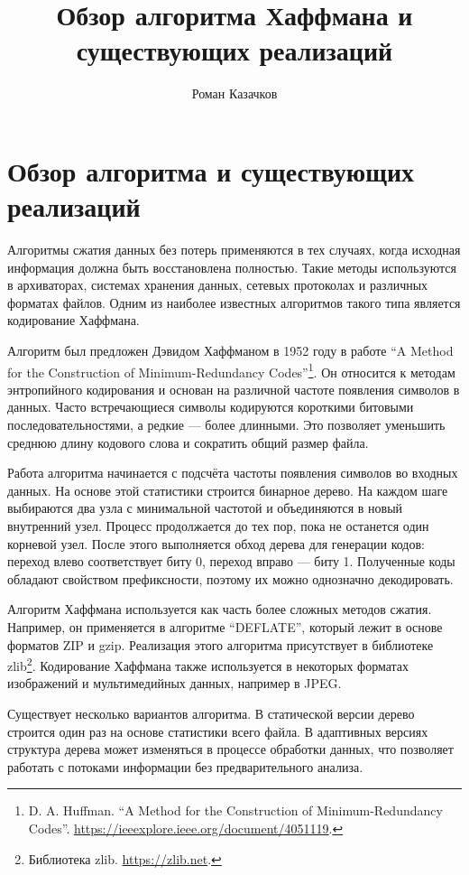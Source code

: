 \documentclass[a4paper]{article}
\title{Обзор алгоритма Хаффмана и существующих реализаций}
\author{Роман Казачков}
\date{}
\begin{document}
\maketitle

\section{Обзор алгоритма и существующих реализаций}

Алгоритмы сжатия данных без потерь применяются в тех случаях, когда исходная
информация должна быть восстановлена полностью. Такие методы используются в
архиваторах, системах хранения данных, сетевых протоколах и различных форматах
файлов. Одним из наиболее известных алгоритмов такого типа является кодирование
Хаффмана.

Алгоритм был предложен Дэвидом Хаффманом в 1952 году в работе \enquote{A Method
for the Construction of Minimum-Redundancy Codes}\footnote{D. A. Huffman.
\enquote{A Method for the Construction of Minimum-Redundancy Codes}.
\url{https://ieeexplore.ieee.org/document/4051119}.}. Он относится к методам энтропийного кодирования
и основан на различной частоте появления символов в данных. Часто встречающиеся
символы кодируются короткими битовыми последовательностями, а редкие --- более
длинными. Это позволяет уменьшить среднюю длину кодового слова и сократить
общий размер файла.

Работа алгоритма начинается с подсчёта частоты появления символов во входных
данных. На основе этой статистики строится бинарное дерево. На каждом шаге
выбираются два узла с минимальной частотой и объединяются в новый внутренний
узел. Процесс продолжается до тех пор, пока не останется один корневой узел.
После этого выполняется обход дерева для генерации кодов: переход влево
соответствует биту 0, переход вправо --- биту 1. Полученные коды обладают
свойством префиксности, поэтому их можно однозначно декодировать.

Алгоритм Хаффмана используется как часть более сложных методов сжатия.
Например, он применяется в алгоритме \enquote{DEFLATE}, который лежит в основе
форматов ZIP и gzip. Реализация этого алгоритма присутствует в библиотеке
zlib\footnote{Библиотека zlib. \url{https://zlib.net}.}. Кодирование Хаффмана также используется в
некоторых форматах изображений и мультимедийных данных, например в JPEG.

Существует несколько вариантов алгоритма. В статической версии дерево строится
один раз на основе статистики всего файла. В адаптивных версиях структура
дерева может изменяться в процессе обработки данных, что позволяет работать с
потоками информации без предварительного анализа.
\end{document}
